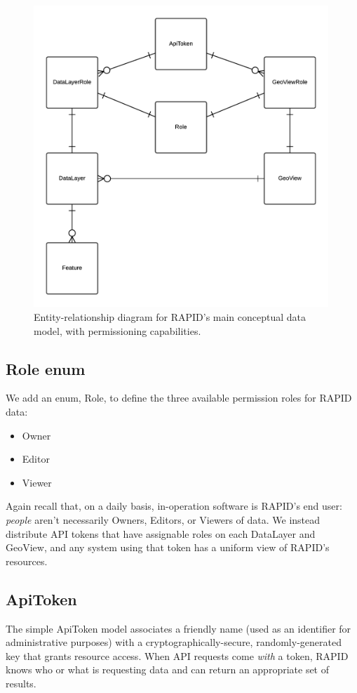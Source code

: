 \begin{figure}[h]
    \centering
    \includegraphics[width=0.99\textwidth]{figures/er.png}
    \caption{Entity-relationship diagram for RAPID's main conceptual data model, with permissioning capabilities.}
    \label{fig:er}
\end{figure}

\subsection{Role enum}
We add an enum, Role, to define the three available permission roles for RAPID data:
\begin{itemize}

  \item Owner
  \item Editor 
  \item Viewer
  \end{itemize}

Again recall that, on a daily basis, in-operation software is RAPID's end user: \textit{people} aren't necessarily Owners, Editors, or Viewers of data. We instead distribute API tokens that have assignable roles on each DataLayer and GeoView, and any system using that token has a uniform view of RAPID's resources.

\subsection{ApiToken}
The simple ApiToken model associates a friendly name (used as an identifier for administrative purposes) with a cryptographically-secure, randomly-generated key that grants resource access. When API requests come \textit{with} a token, RAPID knows who or what is requesting data and can return an appropriate set of results.


